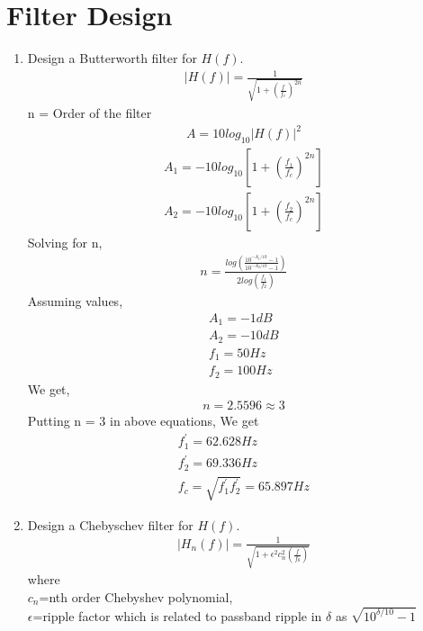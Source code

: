 \documentclass[journal,12pt,twocolumn]{IEEEtran}
\renewcommand\thesection{\arabic{section}}
\begin{document}
\section{Filter Design}
\begin{enumerate}[label=\thesection.\arabic*
,ref=\thesection.\theenumi]
\item Design a Butterworth filter for $H(f)$.\\
\solution 
		\begin{align}
		|H(f)|=\frac{1}{\sqrt{1+\left(\frac{f}{f_c}\right)^{2n}}}
	\end{align}
		n = Order of the filter\\
		\begin{align}
			A=10 log_{10}|H(f)|^2
		\end{align}
		\begin{align}
			A_1=-10 log_{10} \left[1+\left(\frac{f_1}{f_c}\right)^{2n}\right]\\
A_2=-10 log_{10} \left[1+\left(\frac{f_2}{f_c}\right)^{2n}\right]
		\end{align}
		Solving for n,
		\begin{align}
			n=\frac{log\left(\frac{10^{-{A_1}/10}-1}{ 10^{-{A_2}/10}-1}\right)}{2 log \left(\frac{f_1}{f_2}\right)}
		\end{align}
Assuming values,
		\begin{align}
		A_1 = -1 dB\\
		A_2 = -10 dB\\
		f_1 = 50 Hz\\
		f_2 = 100 Hz
		\end{align}
		We get,
		\begin{align}
			n=2.5596 \approx 3 
		\end{align}
		Putting n = 3 in above equations, We get 
		\begin{align}
			f_1^{'} = 62.628 Hz \\
			f_2^{'} = 69.336 Hz \\
			f_c = \sqrt{f_1^{'} f_2^{'}}=65.897 Hz
		\end{align}
\item Design a Chebyschev filter for $H(f)$.
\solution 
		\begin{align}
		|H_n(f)|=\frac{1}{\sqrt{1+\epsilon^{2}c_{n}^2\left(\frac{f}{f_0}\right)}}
	\end{align}
where \\$c_n$=nth order Chebyshev polynomial,\\
		$\epsilon$=ripple factor which is related to passband ripple in $\delta$ as $\sqrt{10^{\delta / 10}-1}$\\

\end{enumerate}
\end{document}
